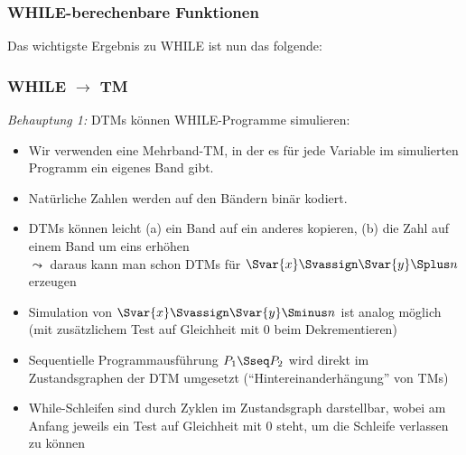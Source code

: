 \documentclass[aspectratio=1610,onlymath]{beamer}
\begin{document}
\begin{frame}\frametitle{WHILE-berechenbare Funktionen}

\bigskip\pause

Das wichtigste Ergebnis zu WHILE ist nun das folgende:


\end{frame}

\begin{frame}\frametitle{WHILE $\to$ TM}

\emph{Behauptung 1:} DTMs können WHILE-Programme simulieren:\pause
\medskip

\begin{itemize}
\item Wir verwenden eine Mehrband-TM, in der es für jede Variable im simulierten Programm ein eigenes Band gibt.\pause
\item Natürliche Zahlen werden auf den Bändern binär kodiert.\pause
\item DTMs können leicht (a) ein Band auf ein anderes kopieren, (b) die Zahl auf einem Band um eins erhöhen \\$\leadsto$ daraus kann man schon DTMs für $\Svar{x}\Svassign\Svar{y}\Splus n$ erzeugen\pause
\item Simulation von $\Svar{x}\Svassign\Svar{y}\Sminus n$ ist analog möglich (mit zusätzlichem Test auf Gleichheit mit $0$ beim Dekrementieren)\pause
\item Sequentielle Programmausführung $P_1\Sseq P_2$ wird direkt im Zustandsgraphen der DTM umgesetzt ("`Hintereinanderhängung"' von TMs)\pause
\item While-Schleifen sind durch Zyklen im Zustandsgraph darstellbar, wobei am Anfang jeweils ein Test auf Gleichheit mit $0$ steht, um die Schleife verlassen zu können
\end{itemize}


\end{frame}
\end{document}
